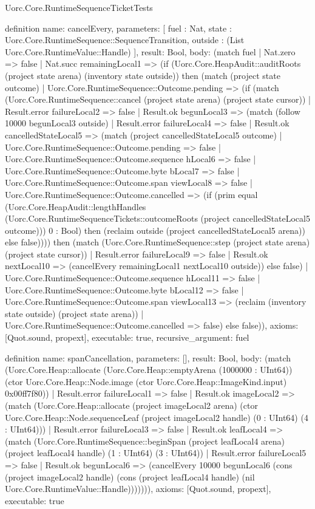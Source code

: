 \begin{lexlean}{Uorc.Core.RuntimeSequenceTicketTests}
\begin{semanticmodule}
definition{
  name: cancelEvery,
  parameters: [
    fuel : Nat,
    state : Uorc.Core.RuntimeSequence::SequenceTransition,
    outside : (List Uorc.Core.RuntimeValue::Handle)
  ],
  result: Bool,
  body: (match fuel
    | Nat.zero => false
    | Nat.succ remainingLocal1 => (if (Uorc.Core.HeapAudit::auditRoots (project state arena) (inventory state outside)) then (match (project state outcome)
      | Uorc.Core.RuntimeSequence::Outcome.pending => (if (match (Uorc.Core.RuntimeSequence::cancel (project state arena) (project state cursor))
        | Result.error failureLocal2 => false
        | Result.ok begunLocal3 => (match (follow 10000 begunLocal3 outside)
          | Result.error failureLocal4 => false
          | Result.ok cancelledStateLocal5 => (match (project cancelledStateLocal5 outcome)
            | Uorc.Core.RuntimeSequence::Outcome.pending => false
            | Uorc.Core.RuntimeSequence::Outcome.sequence hLocal6 => false
            | Uorc.Core.RuntimeSequence::Outcome.byte bLocal7 => false
            | Uorc.Core.RuntimeSequence::Outcome.span viewLocal8 => false
            | Uorc.Core.RuntimeSequence::Outcome.cancelled => (if (prim equal (Uorc.Core.HeapAudit::lengthHandles (Uorc.Core.RuntimeSequenceTickets::outcomeRoots (project cancelledStateLocal5 outcome))) 0 : Bool) then (reclaim outside (project cancelledStateLocal5 arena)) else false)))) then (match (Uorc.Core.RuntimeSequence::step (project state arena) (project state cursor))
        | Result.error failureLocal9 => false
        | Result.ok nextLocal10 => (cancelEvery remainingLocal1 nextLocal10 outside)) else false)
      | Uorc.Core.RuntimeSequence::Outcome.sequence hLocal11 => false
      | Uorc.Core.RuntimeSequence::Outcome.byte bLocal12 => false
      | Uorc.Core.RuntimeSequence::Outcome.span viewLocal13 => (reclaim (inventory state outside) (project state arena))
      | Uorc.Core.RuntimeSequence::Outcome.cancelled => false) else false)),
  axioms: [Quot.sound, propext],
  executable: true,
  recursive_argument: fuel
}

definition{
  name: spanCancellation,
  parameters: [],
  result: Bool,
  body: (match (Uorc.Core.Heap::allocate (Uorc.Core.Heap::emptyArena (1000000 : UInt64)) (ctor Uorc.Core.Heap::Node.image (ctor Uorc.Core.Heap::ImageKind.input) 0x00ff7f80))
    | Result.error failureLocal1 => false
    | Result.ok imageLocal2 => (match (Uorc.Core.Heap::allocate (project imageLocal2 arena) (ctor Uorc.Core.Heap::Node.sequenceLeaf (project imageLocal2 handle) (0 : UInt64) (4 : UInt64)))
      | Result.error failureLocal3 => false
      | Result.ok leafLocal4 => (match (Uorc.Core.RuntimeSequence::beginSpan (project leafLocal4 arena) (project leafLocal4 handle) (1 : UInt64) (3 : UInt64))
        | Result.error failureLocal5 => false
        | Result.ok begunLocal6 => (cancelEvery 10000 begunLocal6 (cons (project imageLocal2 handle) (cons (project leafLocal4 handle) (nil Uorc.Core.RuntimeValue::Handle))))))),
  axioms: [Quot.sound, propext],
  executable: true
}


\end{semanticmodule}
\end{lexlean}
